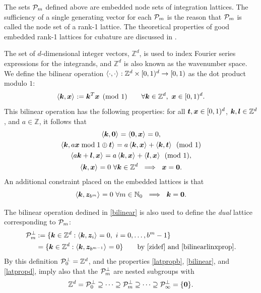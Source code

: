 \documentclass[graybox]{svmult}
\newcommand{\Z}{\mathbb{Z}} %
\newcommand{\N}{\mathbb{N}} %
\newcommand{\bszero}{\boldsymbol{0}} %
\newcommand{\bst}{\boldsymbol{t}}    %
\newcommand{\bsx}{\boldsymbol{x}}    %
\newcommand{\bsz}{\boldsymbol{z}}    %
\begin{document}
The sets $\mathcal{P}_m$ defined above are embedded node sets of integration lattices. The sufficiency of a single generating vector for each $\mathcal{P}_m$ is the reason that $\mathcal{P}_m$ is called the node set of a rank-1 lattice. 
The theoretical properties of good embedded rank-1 lattices for cubature are discussed in \cite{HicNie03a}.  
 
The set of $d$-dimensional integer vectors, $\Z^d$, is used to index Fourier series expressions for the integrands, and $\Z^d$ is also known as the wavenumber space. We define the bilinear operation $\ip{\cdot}{\cdot}: \Z^d \times \cube \to [0,1)$ as the dot product modulo $1$: 
\begin{equation}\label{bilinear}
\ip{\bsk}{\bsx}:=\bsk^T\bsx\pmod 1 \qquad \forall \bsk \in \Z^d, \ \bsx \in \cube.
\end{equation}
This bilinear operation has the following properties: for all $\bst, \bsx \in \cube$, $\bsk, \bsl \in \Z^d$, and $a \in \Z$, it follows that
\begin{subequations}
\begin{gather}
\ip{\bsk}{\bszero} = \ip{\bszero}{\bsx} = 0,\\
\ip{\bsk}{a \bsx \bmod 1 \oplus \bst} = a\ip{\bsk}{\bsx} + \ip{\bsk}{\bst} \pmod 1 \label{bilinearlinxprop} \\
\ip{a \bsk + \bsl}{\bsx} = a\ip{\bsk}{\bsx} + \ip{\bsl}{\bsx} \pmod 1, \label{bilinearlinkprop}\\
\ip{\bsk}{\bsx} = 0 \ \forall \bsk \in \Z^d \ \implies \ \bsx=\bszero.\label{bilinearlinzeroprop}
\end{gather}
\end{subequations}
An additional constraint placed on the embedded lattices is that
\begin{equation}
\ip{\bsk}{\bsz_{b^m}} =  0 \ \forall m \in \N_0   \ \implies \ \bsk=\bszero. \label{latpropd}
\end{equation}

The bilinear operation dedined in \eqref{bilinear} is also used to define the \emph{dual} lattice corresponding to $\mathcal{P}_m$:
\begin{align}
\nonumber
\cp^{\perp}_m & := \{\bsk \in \Z^d : \ip{\bsk}{\bsz_i} = 0, \ i=0, \ldots, b^m-1\} \\
&= \{\bsk \in \Z^d : \ip{\bsk}{\bsz_{b^{m-1}}} = 0 \} \qquad \text{by \eqref{zidef} and \eqref{bilinearlinxprop}} .\label{dualdef}
\end{align}
By this definition $\cp^{\perp}_{0}=\Z^d$, and the properties \eqref{latpropb}, \eqref{bilinear}, and \eqref{latpropd}, imply also that the $\mathcal{P}^{\perp}_m$ are nested subgroups with
\begin{equation}\label{dualemb}
\Z^d=\cp^{\perp}_{0}\supseteq\dots\supseteq\cp^{\perp}_{m}\supseteq\dots\supseteq\cp^{\perp}_{\infty}=\{\bszero\}.
\end{equation}
\end{document}
